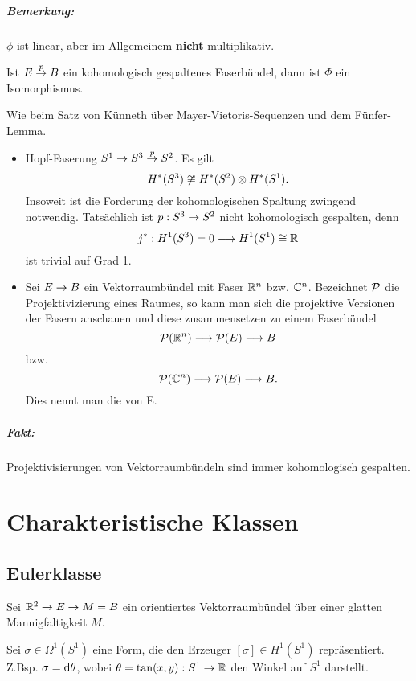 \paragraph{Bemerkung:}
$\phi$ ist linear, aber im Allgemeinem \textbf{nicht} multiplikativ.

\Satz{}
Ist $E \pfeil{p} B$ ein kohomologisch gespaltenes Faserbündel, dann ist $\Phi$ ein Isomorphismus.
\begin{Beweis}{}
Wie beim Satz von Künneth über Mayer-Vietoris-Sequenzen und dem Fünfer-Lemma.
\end{Beweis}


\Bsp{}
\begin{itemize}
	\item Hopf-Faserung $S^1 \pfeil{} S^3 \pfeil{p} S^2$. Es gilt
	\[ H^*(S^3) \not\isom{} H^*(S^2) \otimes H^*(S^1). \]
	Insoweit ist die Forderung der kohomologischen Spaltung zwingend notwendig. Tatsächlich ist $p : S^3 \pfeil{} S^2$ nicht kohomologisch gespalten, denn
	\[ j^* : H^1(S^3) = 0 \Pfeil{} H^1(S^1) \isom{} \R \]
	ist trivial auf Grad 1.
	\item Sei $E \pfeil{} B$ ein Vektorraumbündel mit Faser $\R^n$ bzw. $\C^n$. Bezeichnet $\P$ die Projektivizierung eines Raumes, so kann man sich die projektive Versionen der Fasern anschauen und diese zusammensetzen zu einem Faserbündel
	\[ \P (\R^n) \Pfeil{} \P(E) \Pfeil{} B \]
	bzw.
	\[ \P (\C^n) \Pfeil{} \P(E) \Pfeil{} B. \]
	Dies nennt man die  von E.
\end{itemize}

\paragraph{Fakt:}
Projektivisierungen von Vektorraumbündeln sind immer kohomologisch gespalten.

\chapter{Charakteristische Klassen}
\section{Eulerklasse}
Sei $\R^2 \pfeil{} E \pfeil{} M = B$ ein orientiertes Vektorraumbündel über einer glatten Mannigfaltigkeit $M$.

Sei $\sigma \in \Omega^1(S^1)$ eine Form, die den Erzeuger $[\sigma] \in H^1(S^1)$ repräsentiert. Z.Bsp. $\sigma = \d \theta$, wobei $\theta = \tan(x,y) : S^1 \pfeil{} \R$ den Winkel auf $S^1$ darstellt.

